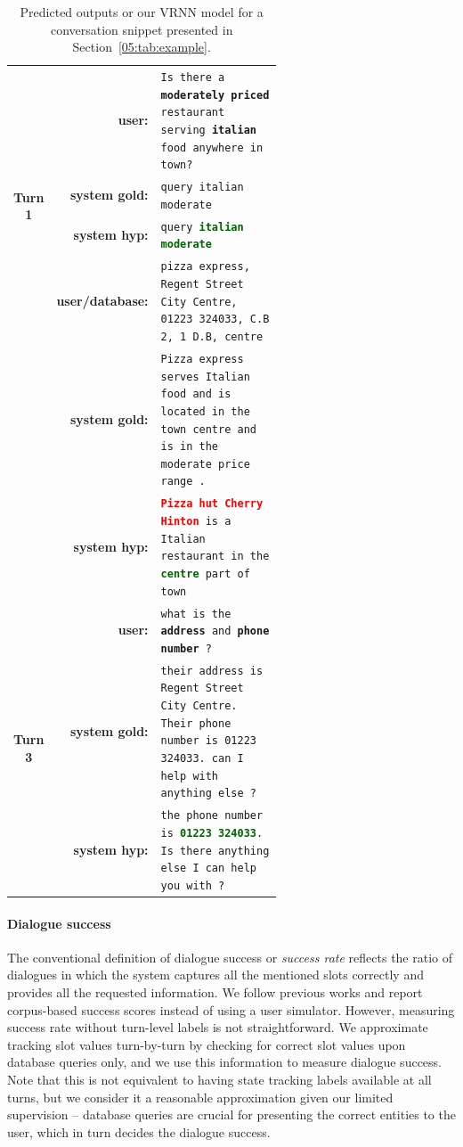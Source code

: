 \begin{table}[tp]
    \centering\scriptsize
    \begin{tabular}{crp{0.6\linewidth}}
        \toprule
         \multirow{4}{*}{\bf Turn 1}&\bf user:& \texttt{Is there a \textbf{moderately priced} restaurant serving \textbf{italian} food anywhere in town?} \\
         &\bf system gold: & \texttt{query italian moderate} \\
         &\bf system hyp: & \texttt{query \textbf{\textcolor{darkgreen}{italian moderate}}}  \\
         \midrule
        \multirow{4}{*}{\bf Turn 2}&\bf user/database:& \texttt{pizza express, Regent Street City Centre, 01223 324033, C.B 2, 1 D.B, centre}  \\
         &\bf system gold:& \texttt{Pizza express serves Italian food and is located in the town centre and is in the moderate price range .} \\        
        &\bf system hyp:& \texttt{\textbf{\textcolor{red}{Pizza hut Cherry Hinton}} is a Italian restaurant in the \textbf{\textcolor{darkgreen}{centre}} part of town} \\
         \midrule
        \multirow{4}{*}{\bf Turn 3}&\bf user:& \texttt{what is the \textbf{address} and \textbf{phone number} ?} \\
        &\bf system gold:& \texttt{their address is  Regent Street City Centre. Their phone number is 01223 324033. can I help with anything else ?} \\
        & \bf system hyp:& \texttt{the phone number is \textbf{\textcolor{darkgreen}{01223 324033}}. Is there anything else I can help you with ?} \\
        \bottomrule
    \end{tabular}
    \vspace{-2mm}
    \caption{Predicted outputs or our VRNN model for a conversation snippet presented in Section~\ref{05:tab:example}.}
    \label{05:tab:example-cont}
\end{table}

\paragraph{Dialogue success}
The conventional definition of dialogue success or \emph{success rate} reflects the ratio of dialogues in which the system captures all the mentioned slots correctly and provides all the requested information.
We follow previous works \cite{nekvinda2021shades} and report corpus-based success scores instead of using a user simulator.
However, measuring success rate without turn-level labels is not straightforward.
We approximate tracking slot values turn-by-turn by checking for correct slot values upon database queries only, and we use this information to measure dialogue success.
Note that this is not equivalent to having state tracking labels available at all turns, but we consider it a reasonable approximation given our limited supervision -- database queries are crucial for presenting the correct entities to the user, which in turn decides the dialogue success.

